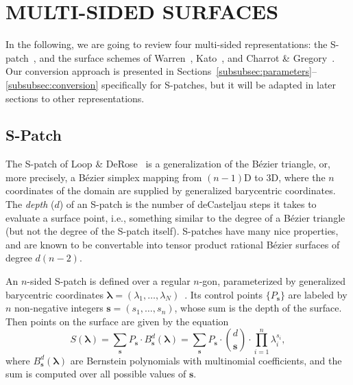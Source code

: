 \documentclass[9pt,academicons]{article}
\begin{document}
\section{MULTI-SIDED SURFACES}
\label{sec:multisided}
In the following, we are going to review four multi-sided representations:
the S-patch~\cite{Loop:1989}, and the surface schemes of Warren~\cite{Warren:1992},
Kato~\cite{Kato:1991}, and Charrot \& Gregory~\cite{Charrot:1984}.
Our conversion approach is presented in
Sections~\ref{subsubsec:parameters}--\ref{subsubsec:conversion}
specifically for S-patches, but it will be adapted in later sections to other representations.

\subsection{S-Patch}
\label{subsec:spatch}
The S-patch of Loop \& DeRose~\cite{Loop:1989} is a generalization of the B\'ezier triangle, or,
more precisely, a B\'ezier simplex mapping from $(n-1)$D to 3D, where the $n$ coordinates of the
domain are supplied by generalized barycentric coordinates. The \emph{depth} ($d$) of an S-patch
is the number of deCasteljau steps it takes to evaluate a surface point, i.e., something similar
to the degree of a B\'ezier triangle (but not the degree of the S-patch itself).
S-patches have many nice properties, and are known to be convertable into tensor product
rational B\'ezier surfaces of degree $d(n-2)$.

An $n$-sided S-patch is defined over a regular $n$-gon, parameterized by generalized
barycentric coordinates $\mathbf{\lambda}=(\lambda_1,\dots,\lambda_N)$~\cite{Hormann:2017}.
Its control
points $\{P_\mathbf{s}\}$ are labeled by $n$ non-negative integers $\mathbf{s}=(s_1,\dots,s_n)$,
whose sum is the depth of the surface. Then points on the surface are given by
the equation
\begin{equation}
  \label{eq:spatch}
  S(\mathbf{\lambda})=\sum_{\mathbf{s}}P_\mathbf{s}\cdot B_\mathbf{s}^d(\mathbf{\lambda})
  =\sum_{\mathbf{s}}P_\mathbf{s}\cdot {d\choose\mathbf{s}}\cdot\prod_{i=1}^n\lambda_i^{s_i},
\end{equation}
where $B_\mathbf{s}^d(\mathbf{\lambda})$ are Bernstein polynomials with multinomial coefficients,
and the sum is computed over all possible values of $\mathbf{s}$.
\end{document}
